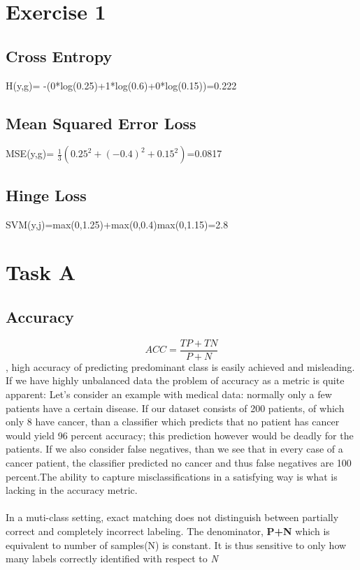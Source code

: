 \documentclass[10pt]{article}
\begin{document}
\section{Exercise 1}
\subsection{Cross Entropy}
H(y,g)= -(0*log(0.25)+1*log(0.6)+0*log(0.15))=0.222
\subsection{Mean Squared Error Loss}
MSE(y,g)= $\frac{1}{3}(0.25^2+(-0.4)^2+0.15^2)$=0.0817
\subsection{Hinge Loss}
SVM(y,j)=max(0,1.25)+max(0,0.4)max(0,1.15)=2.8

\section{Task A}
\subsection{Accuracy}
$$ACC = \frac{TP+TN}{P+N}$$, high accuracy of predicting predominant class is easily achieved and misleading.
If we have highly unbalanced data the problem of accuracy as a metric is quite apparent:
Let's consider an example with medical data: normally only a few patients have a certain disease.
If our dataset consists of 200 patients, of which only 8 have cancer, than a classifier which predicts
that no patient has cancer would yield 96 percent accuracy;
this prediction however would be deadly for the patients.
If we also consider false negatives, than we see that in every case of a cancer patient,
the classifier predicted no cancer and thus false negatives are 100 percent.The ability to  capture misclassifications in a satisfying way is what is lacking in the accuracy metric.
\paragraph{}
In a muti-class setting, exact matching does not distinguish between partially correct and completely incorrect labeling.
The denominator, \textbf{P+N} which is equivalent to number of samples(N) is constant. It is thus sensitive to only how many labels correctly identified with respect to \textit{N}
\end{document}
